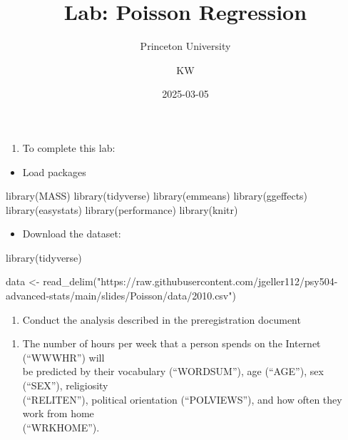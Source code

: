 \documentclass[
  letterpaper,
  DIV=11,
  numbers=noendperiod]{scrartcl}
\title{Lab: Poisson Regression}
\subtitle{Princeton University}
\author{KW}
\date{2025-03-05}
\newenvironment{Shaded}{\begin{snugshade}}{\end{snugshade}}
\newcommand{\FunctionTok}[1]{\textcolor[rgb]{0.28,0.35,0.67}{#1}}
\newcommand{\NormalTok}[1]{\textcolor[rgb]{0.00,0.23,0.31}{#1}}
\newcommand{\OtherTok}[1]{\textcolor[rgb]{0.00,0.23,0.31}{#1}}
\newcommand{\StringTok}[1]{\textcolor[rgb]{0.13,0.47,0.30}{#1}}
\providecommand{\tightlist}{%
  \setlength{\itemsep}{0pt}\setlength{\parskip}{0pt}}\usepackage{longtable,booktabs,array}
\begin{document}
\maketitle

\begin{enumerate}
\def\labelenumi{\arabic{enumi}.}
\tightlist
\item
  To complete this lab:
\end{enumerate}

\begin{itemize}
\tightlist
\item
  Load packages
\end{itemize}

\begin{Shaded}
\begin{Highlighting}[]
\FunctionTok{library}\NormalTok{(MASS)}
\FunctionTok{library}\NormalTok{(tidyverse)}
\FunctionTok{library}\NormalTok{(emmeans)}
\FunctionTok{library}\NormalTok{(ggeffects)}
\FunctionTok{library}\NormalTok{(easystats)}
\FunctionTok{library}\NormalTok{(performance)}
\FunctionTok{library}\NormalTok{(knitr)}
\end{Highlighting}
\end{Shaded}

\begin{itemize}
\tightlist
\item
  Download the dataset:
\end{itemize}

\begin{Shaded}
\begin{Highlighting}[]
\FunctionTok{library}\NormalTok{(tidyverse)}

\NormalTok{data }\OtherTok{\textless{}{-}} \FunctionTok{read\_delim}\NormalTok{(}\StringTok{"https://raw.githubusercontent.com/jgeller112/psy504{-}advanced{-}stats/main/slides/Poisson/data/2010.csv"}\NormalTok{)}
\end{Highlighting}
\end{Shaded}

\begin{enumerate}
\def\labelenumi{\arabic{enumi}.}
\setcounter{enumi}{1}
\tightlist
\item
  Conduct the analysis described in the preregistration document
\end{enumerate}

\begin{enumerate}
\def\labelenumi{\alph{enumi}.}
\tightlist
\item
  The number of hours per week that a person spends on the Internet
  (``WWWHR'') will\\
  be predicted by their vocabulary (``WORDSUM''), age (``AGE''), sex
  (``SEX''), religiosity\\
  (``RELITEN''), political orientation (``POLVIEWS''), and how often
  they work from home\\
  (``WRKHOME'').
\end{enumerate}
\end{document}
